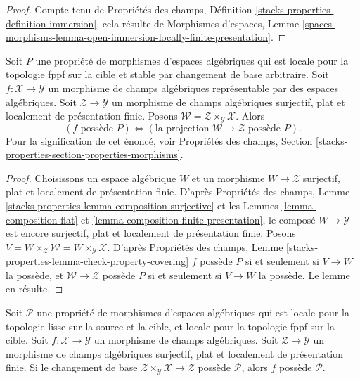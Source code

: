\begin{proof}
Compte tenu de Propriétés des champs, Définition
\ref{stacks-properties-definition-immersion}, cela résulte de Morphismes
d'espaces, Lemme
\ref{spaces-morphisms-lemma-open-immersion-locally-finite-presentation}.
\end{proof}

\begin{lemma}
\label{lemma-check-property-after-fppf-base-change}
Soit $P$ une propriété de morphismes d'espaces algébriques qui est locale pour
la topologie fppf sur la cible et stable par changement de base arbitraire.
Soit $f : \mathcal{X} \to \mathcal{Y}$ un morphisme de champs algébriques
représentable par des espaces algébriques. Soit
$\mathcal{Z} \to \mathcal{Y}$ un morphisme de champs algébriques surjectif,
plat et localement de présentation finie. Posons
$\mathcal{W} = \mathcal{Z} \times_\mathcal{Y} \mathcal{X}$. Alors
$$
(f\text{ possède }P) \Leftrightarrow
(\text{la projection }\mathcal{W} \to \mathcal{Z}\text{ possède }P).
$$
Pour la signification de cet énoncé, voir Propriétés des champs, Section
\ref{stacks-properties-section-properties-morphisms}.
\end{lemma}

\begin{proof}
Choisissons un espace algébrique $W$ et un morphisme
$W \to \mathcal{Z}$ surjectif, plat et localement de présentation finie.
D'après Propriétés des champs, Lemme
\ref{stacks-properties-lemma-composition-surjective}
et les Lemmes \ref{lemma-composition-flat} et
\ref{lemma-composition-finite-presentation}, le composé
$W \to \mathcal{Y}$ est encore surjectif, plat et localement de présentation
finie. Posons
$V = W \times_\mathcal{Z} \mathcal{W} = W \times_\mathcal{Y} \mathcal{X}$.
D'après Propriétés des champs, Lemme
\ref{stacks-properties-lemma-check-property-covering}
$f$ possède $P$ si et seulement si $V \to W$ la possède, et
$\mathcal{W} \to \mathcal{Z}$ possède $P$ si et seulement si $V \to W$
la possède. Le lemme en résulte.
\end{proof}

\begin{lemma}
\label{lemma-descent-property}
Soit $\mathcal{P}$ une propriété de morphismes d'espaces algébriques qui est
locale pour la topologie lisse sur la source et la cible, et locale pour la
topologie fppf sur la cible. Soit
$f : \mathcal{X} \to \mathcal{Y}$ un morphisme de champs algébriques. Soit
$\mathcal{Z} \to \mathcal{Y}$ un morphisme de champs algébriques surjectif,
plat et localement de présentation finie. Si le changement de base
$\mathcal{Z} \times_\mathcal{Y} \mathcal{X} \to \mathcal{Z}$
possède $\mathcal{P}$, alors $f$ possède $\mathcal{P}$.
\end{lemma}

